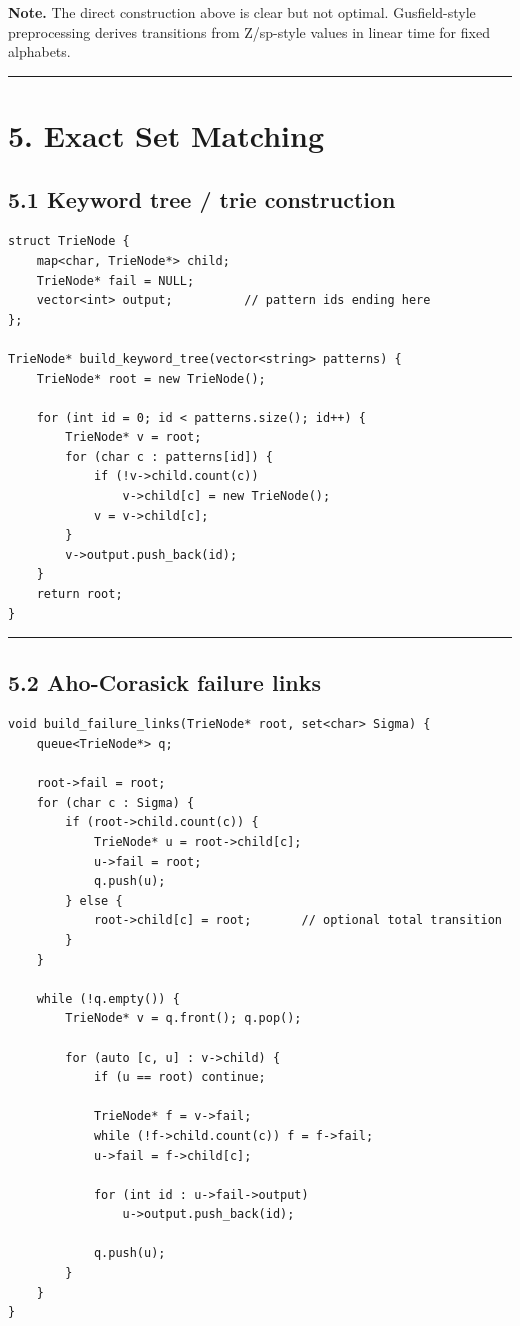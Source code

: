 \documentclass[11pt]{article}
\begin{document}
\textbf{Note.} The direct construction above is clear but not optimal. Gusfield-style preprocessing derives transitions from Z/sp-style values in linear time for fixed alphabets.

\begin{center}\rule{0.5\linewidth}{0.5pt}\end{center}

\section{5. Exact Set Matching}\label{exact-set-matching}

\subsection{5.1 Keyword tree / trie construction}\label{keyword-tree-trie-construction}

\begin{verbatim}
struct TrieNode {
    map<char, TrieNode*> child;
    TrieNode* fail = NULL;
    vector<int> output;          // pattern ids ending here
};

TrieNode* build_keyword_tree(vector<string> patterns) {
    TrieNode* root = new TrieNode();

    for (int id = 0; id < patterns.size(); id++) {
        TrieNode* v = root;
        for (char c : patterns[id]) {
            if (!v->child.count(c))
                v->child[c] = new TrieNode();
            v = v->child[c];
        }
        v->output.push_back(id);
    }
    return root;
}
\end{verbatim}

\begin{center}\rule{0.5\linewidth}{0.5pt}\end{center}

\subsection{5.2 Aho-Corasick failure links}\label{aho-corasick-failure-links}

\begin{verbatim}
void build_failure_links(TrieNode* root, set<char> Sigma) {
    queue<TrieNode*> q;

    root->fail = root;
    for (char c : Sigma) {
        if (root->child.count(c)) {
            TrieNode* u = root->child[c];
            u->fail = root;
            q.push(u);
        } else {
            root->child[c] = root;       // optional total transition
        }
    }

    while (!q.empty()) {
        TrieNode* v = q.front(); q.pop();

        for (auto [c, u] : v->child) {
            if (u == root) continue;

            TrieNode* f = v->fail;
            while (!f->child.count(c)) f = f->fail;
            u->fail = f->child[c];

            for (int id : u->fail->output)
                u->output.push_back(id);

            q.push(u);
        }
    }
}
\end{verbatim}
\end{document}
